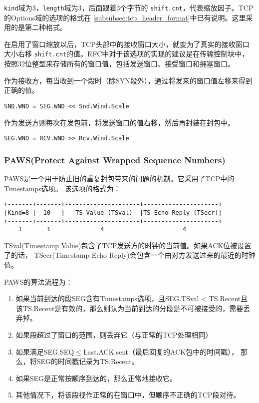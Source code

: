 \texttt{kind}域为3，\texttt{length}域为3，后面跟着3个字节的
\texttt{shift.cnt}，代表缩放因子。TCP的Options域的选项的格式在
\ref{subsubsec:tcp_header_format}中已有说明。这里采用的是第二种格式。

在启用了窗口缩放以后，TCP头部中的接收窗口大小，就变为了真实的接收窗口大小右移
\texttt{shift.cnt}的值。RFC中对于该选项的实现的建议是在传输控制块中，
按照32位整型来存储所有的窗口值，包括发送窗口、接受窗口和拥塞窗口。

作为接收方，每当收到一个段时（除SYN段外），通过将发来的窗口值左移来得到正确的值。
\begin{verbatim}
SND.WND = SEG.WND << Snd.Wind.Scale
\end{verbatim}

作为发送方则每次在发包前，将发送窗口的值右移，然后再封装在封包中。
\begin{verbatim}
SEG.WND = RCV.WND >> Rcv.Wind.Scale
\end{verbatim}

\subsubsection{PAWS(Protect Against Wrapped Sequence Numbers)}
PAWS是一个用于防止旧的重复封包带来的问题的机制。它采用了TCP中的Timestamps选项。
该选项的格式为：
\begin{verbatim}
+-------+-------+---------------------+---------------------+ 
|Kind=8 |  10   |   TS Value (TSval)  |TS Echo Reply (TSecr)| 
+-------+-------+---------------------+---------------------+
    1       1              4                      4
\end{verbatim}

TSval(Timestamp Value)包含了TCP发送方的时钟的当前值。如果ACK位被设置了的话，
TSecr(Timestamp Echo Reply)会包含一个由对方发送过来的最近的时钟值。

PAWS的算法流程为：
\begin{enumerate}
  \item 如果当前到达的段SEG含有Timestamps选项，且SEG.TSval < TS.Recent且
该TS.Recent是有效的，那么则认为当前到达的分段是不可被接受的，需要丢弃掉。
  \item 如果段超过了窗口的范围，则丢弃它（与正常的TCP处理相同）
  \item 如果满足SEG.SEQ$\leqslant$Last.ACK.sent（最后回复的ACK包中的时间戳），
    那么，将SEG的时间戳记录为TS.Recent。
  \item 如果SEG是正常按顺序到达的，那么正常地接收它。
  \item 其他情况下，将该段视作正常的在窗口中，但顺序不正确的TCP段对待。
\end{enumerate}

